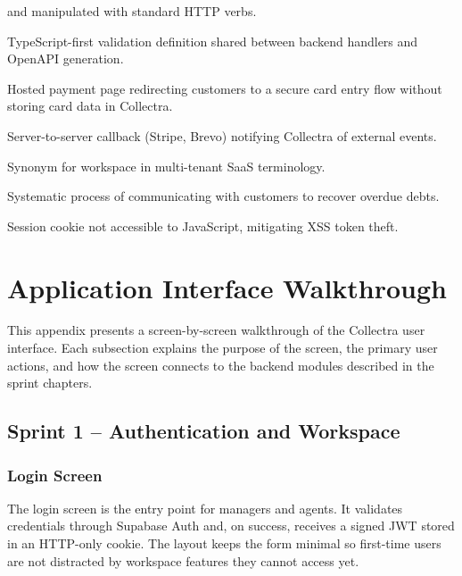 \documentclass[12pt,a4paper]{report}
\begin{document}
\begin{description}[style=nextline, leftmargin=3.2cm, labelwidth=2.8cm, itemsep=7pt]
                         and manipulated with standard HTTP verbs.
  \item[Zod schema]      TypeScript-first validation definition shared between backend
                         handlers and OpenAPI generation.
  \item[Stripe Checkout] Hosted payment page redirecting customers to a secure card
                         entry flow without storing card data in Collectra.
  \item[Webhook]         Server-to-server callback (Stripe, Brevo) notifying Collectra
                         of external events.
  \item[Tenant]          Synonym for workspace in multi-tenant SaaS terminology.
  \item[Dunning]         Systematic process of communicating with customers to recover
                         overdue debts.
  \item[HTTP-only cookie] Session cookie not accessible to JavaScript, mitigating
                         XSS token theft.
\end{description}

\chapter{Application Interface Walkthrough}
\label{app:screenshots}

This appendix presents a screen-by-screen walkthrough of the Collectra user
interface.
Each subsection explains the purpose of the screen, the primary user actions, and
how the screen connects to the backend modules described in the sprint chapters.

\section{Sprint 1 -- Authentication and Workspace}

\subsection{Login Screen}

The login screen is the entry point for managers and agents.
It validates credentials through Supabase Auth and, on success, receives a signed JWT
stored in an HTTP-only cookie.
The layout keeps the form minimal so first-time users are not distracted by workspace
features they cannot access yet.
\end{document}

